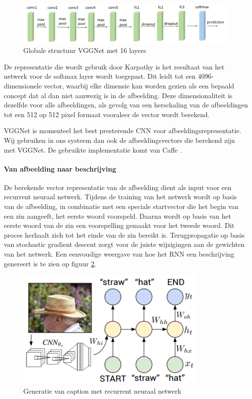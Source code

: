 \begin{figure}[tb]
    \centering
    \includegraphics[width=\linewidth]{Images/vgg16.PNG}
    \caption{Globale structuur VGGNet met 16 layers}
    \label{fig:vggnet}
\end{figure}

De representatie die wordt gebruik door Karpathy is het resultaat van het netwerk voor de softmax layer wordt toegepast. Dit leidt tot een 4096-dimensionele vector, waarbij elke dimensie kan worden gezien als een bepaald concept dat al dan niet aanwezig is in de afbeelding. Deze dimensionaliteit is dezelfde voor alle afbeeldingen, als gevolg van een herschaling van de afbeeldingen tot een 512 op 512 pixel formaat vooraleer de vector wordt berekend.

VGGNet is momenteel het best presterende CNN voor afbeeldingsrepresentatie. Wij gebruiken in ons systeem dan ook de afbeeldingsvectors die berekend zijn met VGGNet. De gebruikte implementatie komt van Caffe .

\paragraph{Van afbeelding naar beschrijving}
De berekende vector representatie van de afbeelding dient als input voor een recurrent neuraal netwerk. Tijdens de training van het netwerk wordt op basis van de afbeelding, in combinatie met een speciale startvector die het begin van een zin aangeeft, het eerste woord voorspeld. Daarna wordt op basis van het eerste woord van de zin een voorspelling gemaakt voor het tweede woord. Dit proces herhaalt zich tot het einde van de zin bereikt is. Terugpropagatie op basis van stochastic gradient descent zorgt voor de juiste wijzigingen aan de gewichten van het netwerk. Een eenvoudige weergave van hoe het RNN een beschrijving genereert is te zien op figuur \ref{fig:rnntraining}.

\begin{figure}[tb]
    \centering
    \includegraphics[width=0.5\linewidth]{Images/karpathy.PNG}
    \caption{Generatie van caption met recurrent neuraal netwerk}
\label{fig:rnntraining}
\end{figure}


